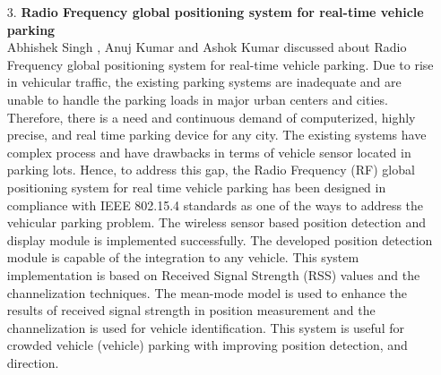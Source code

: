 \documentclass[12pt,a4paper]{report}
\begin{document}
\begin{itemize}
	\item[ 3. ] \textbf{Radio Frequency global positioning system for real-time vehicle parking}\\

Abhishek Singh , Anuj Kumar and Ashok Kumar discussed about Radio Frequency global positioning system for real-time vehicle parking.
	Due to rise in vehicular traffic, the existing parking systems are inadequate and are unable to handle the parking loads in major urban centers and cities. Therefore, there is a need and continuous demand of computerized, highly precise, and real time parking device for any city. The existing systems have complex process and have drawbacks in terms of vehicle sensor located in parking lots. Hence, to address this gap, the Radio Frequency (RF) global positioning system for real time vehicle parking has been designed in compliance with IEEE 802.15.4 standards as one of the ways to address the vehicular parking problem. The wireless sensor based position detection and display module is implemented successfully. The developed position detection module is capable of the integration to any vehicle. This system implementation is based on Received Signal Strength (RSS) values and the channelization techniques. The mean-mode model is used to enhance the results of received signal strength in position measurement and the channelization is used for vehicle identification. This system is useful for crowded vehicle (vehicle) parking with improving position detection, and direction.
	

\end{itemize}
\end{document}
